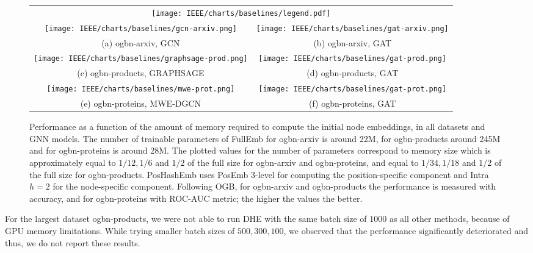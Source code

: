 \documentclass[conference]{IEEEtran}
\begin{document}
\begin{figure*}[!t]
    \centering
    \begin{tabular}{cc}
     \multicolumn{2}{c}{\texttt{[image: IEEE/charts/baselines/legend.pdf]}}\\
     \texttt{[image: IEEE/charts/baselines/gcn-arxiv.png]} &
     \texttt{[image: IEEE/charts/baselines/gat-arxiv.png]} \\
     (a) ogbn-arxiv, GCN & (b) ogbn-arxiv, GAT \\
     \texttt{[image: IEEE/charts/baselines/graphsage-prod.png]} &
     \texttt{[image: IEEE/charts/baselines/gat-prod.png]} \\
     (c) ogbn-products, GRAPHSAGE & (d) ogbn-products, GAT \\
     \texttt{[image: IEEE/charts/baselines/mwe-prot.png]} &
     \texttt{[image: IEEE/charts/baselines/gat-prot.png]} \\
     (e) ogbn-proteins, MWE-DGCN  & (f) ogbn-proteins, GAT  \\
    \end{tabular}
    \caption{Performance as a function of the amount of memory required to compute the initial node embeddings, in all datasets and GNN models. The number of trainable parameters of FullEmb for ogbn-arxiv is around 22M, for ogbn-products around 245M and for ogbn-proteins is around 28M. The plotted values for the number of parameters correspond to memory size which is approximately equal to $1/12, 1/6$ and $1/2$ of the full size for ogbn-arxiv and ogbn-proteins, and equal to $1/34, 1/18$ and $1/2$ of the full size for ogbn-products. 
    PosHashEmb uses PosEmb $3$-level for computing the position-specific component and Intra $h=2$ for the node-specific component. Following OGB, for ogbn-arxiv and ogbn-products the performance is measured with accuracy, and for ogbn-proteins with ROC-AUC metric; the higher the values the better.}
    \label{fig:baselines}
\end{figure*}
%
For the largest dataset ogbn-products, we were not able to run DHE with the same batch size of $1000$ as all other methods, because of GPU memory limitations. 
While trying smaller batch sizes of $500, 300, 100$, we observed that the performance significantly deteriorated and thus, we do not report these results.
\end{document}
